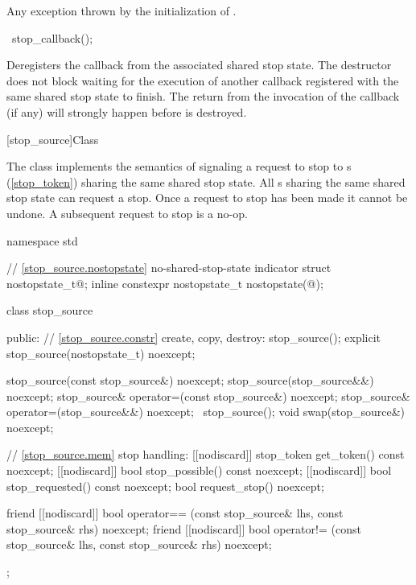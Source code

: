 {\begin{itemdescr}
  \pnum\throws Any exception thrown by the initialization of .
\end{itemdescr}

%
\begin{itemdecl}
~stop_callback();
\end{itemdecl}
\begin{itemdescr}
  \pnum\effects Deregisters the callback from the associated shared stop state.
                The destructor does not block waiting for the execution of another callback registered
                with the same shared stop state to finish.
                The return from the invocation of the callback (if any) will strongly happen before  is destroyed.
\end{itemdescr}

%
[stop_source]{Class }

\pnum
{}%
The class  implements the semantics of signaling a request to stop
to s (\ref{stop_token}) sharing the same shared stop state.
All s sharing the same shared stop state can request a stop.
Once a request to stop has been made it cannot be undone.
A subsequent request to stop is a no-op.

\begin{codeblock}
namespace std {
  // \ref{stop_source.nostopstate} no-shared-stop-state indicator
  struct nostopstate_t{@\seebelow@};
  inline constexpr nostopstate_t nostopstate(@\unspec@);

  class stop_source {
  public:
    // \ref{stop_source.constr} create, copy, destroy:
    stop_source();
    explicit stop_source(nostopstate_t) noexcept;

    stop_source(const stop_source&) noexcept;
    stop_source(stop_source&&) noexcept;
    stop_source& operator=(const stop_source&) noexcept;
    stop_source& operator=(stop_source&&) noexcept;
    ~stop_source();
    void swap(stop_source&) noexcept;

    // \ref{stop_source.mem} stop handling:
    [[nodiscard]] stop_token get_token() const noexcept;
    [[nodiscard]] bool stop_possible() const noexcept;
    [[nodiscard]] bool stop_requested() const noexcept;
    bool request_stop() noexcept;

    friend [[nodiscard]] bool operator== (const stop_source& lhs, const stop_source& rhs) noexcept;
    friend [[nodiscard]] bool operator!= (const stop_source& lhs, const stop_source& rhs) noexcept;
  };
}
\end{codeblock}

}

